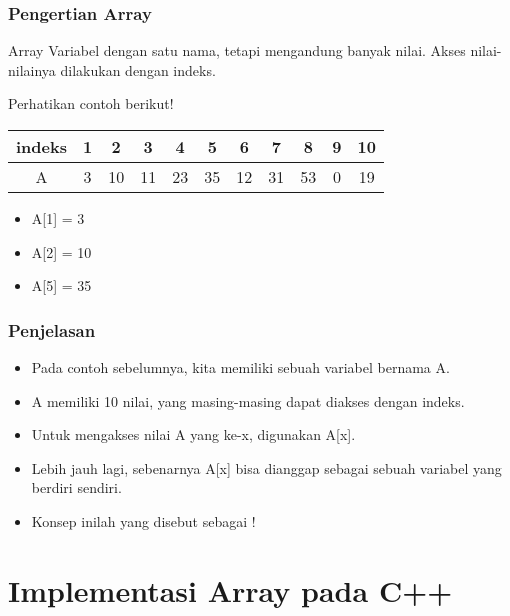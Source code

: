 \begin{frame}
\frametitle{Pengertian Array}
\begin{block}{Array}
Variabel dengan satu nama, tetapi mengandung banyak nilai.
Akses nilai-nilainya dilakukan dengan indeks.
\end{block}
\vfill
Perhatikan contoh berikut!
\vfill
\begin{tabular}{|c|c|c|c|c|c|c|c|c|c|c|}
\hline indeks & 1 & 2 & 3 & 4 & 5 & 6 & 7 & 8 & 9 & 10 \\
\hline A & 3 & 10 & 11 & 23 & 35 & 12 & 31 & 53 & 0 & 19 \\
\hline
\end{tabular}

\begin{itemize}
  \item A[1] = 3
  \item A[2] = 10
  \item A[5] = 35
\end{itemize}
\end{frame}

\begin{frame}
\frametitle{Penjelasan}
\begin{itemize}
  \item Pada contoh sebelumnya, kita memiliki sebuah variabel bernama A.
  \item A memiliki 10 nilai, yang masing-masing dapat diakses dengan indeks.
  \item Untuk mengakses nilai A yang ke-x, digunakan A[x].
  \item Lebih jauh lagi, sebenarnya A[x] bisa dianggap sebagai sebuah variabel yang berdiri sendiri.
  \item Konsep inilah yang disebut sebagai !
\end{itemize}
\end{frame}

\section{Implementasi Array pada C++}
\frame{\sectionpage}

